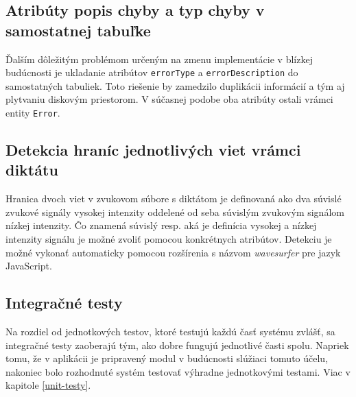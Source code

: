 \documentclass[12pt,oneside]{fithesis2}
\begin{document}
	 	\subsection{Atribúty popis chyby a typ chyby v samostatnej tabuľke}
	 \par Ďalším dôležitým problémom určeným na zmenu implementácie v blízkej budúcnosti je ukladanie atribútov \texttt{errorType} a \texttt{errorDescription} do samostatných tabuliek. Toto riešenie by zamedzilo duplikácii informácií a tým aj plytvaniu diskovým priestorom. V súčasnej podobe oba atribúty ostali vrámci entity \texttt{Error}.
	 
	 	\subsection{Detekcia hraníc jednotlivých viet vrámci diktátu}
\par Hranica dvoch viet v zvukovom súbore s diktátom je definovaná ako dva súvislé zvukové signály vysokej intenzity oddelené od seba súvislým zvukovým signálom nízkej intenzity\cite{wavesurfer14}. Čo znamená súvislý resp. aká je definícia vysokej a nízkej intenzity signálu je možné zvoliť pomocou konkrétnych atribútov. Detekciu je možné vykonať automaticky pomocou rozšírenia s názvom \textit{wavesurfer} pre jazyk JavaScript.
	 
	 	\subsection{Integračné testy}
	 \par Na rozdiel od jednotkových testov, ktoré testujú každú časť systému zvlášť, sa integračné testy zaoberajú tým, ako dobre fungujú jednotlivé časti spolu\cite{sof5}. Napriek tomu, že v aplikácii je pripravený modul v budúcnosti slúžiaci tomuto účelu, nakoniec bolo rozhodnuté systém testovať výhradne jednotkovými testami. Viac v kapitole \ref{unit-testy}.
	 
\end{document}
